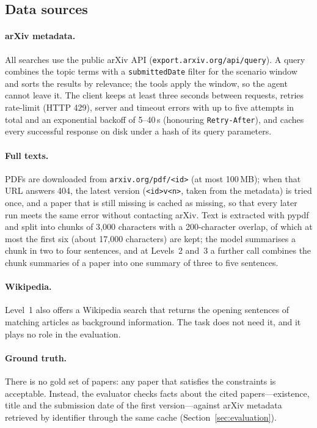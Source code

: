 \subsection{Data sources}
\label{sec:sources}

\paragraph{arXiv metadata.}
All searches use the public arXiv API (\texttt{export.arxiv.org/api/query}). A query combines the topic terms with a \texttt{submittedDate} filter for the scenario window and sorts the results by relevance; the tools apply the window, so the agent cannot leave it. The client keeps at least three seconds between requests, retries rate-limit (HTTP 429), server and timeout errors with up to five attempts in total and an exponential backoff of 5--40\,s (honouring \texttt{Retry-After}), and caches every successful response on disk under a hash of its query parameters.

\paragraph{Full texts.}
PDFs are downloaded from \texttt{arxiv.org/pdf/<id>} (at most 100\,MB); when that URL answers 404, the latest version (\texttt{<id>v<n>}, taken from the metadata) is tried once, and a paper that is still missing is cached as missing, so that every later run meets the same error without contacting arXiv. Text is extracted with pypdf and split into chunks of 3{,}000 characters with a 200-character overlap, of which at most the first six (about 17{,}000 characters) are kept; the model summarises a chunk in two to four sentences, and at Levels~2 and~3 a further call combines the chunk summaries of a paper into one summary of three to five sentences.

\paragraph{Wikipedia.}
Level~1 also offers a Wikipedia search that returns the opening sentences of matching articles as background information. The task does not need it, and it plays no role in the evaluation.

\paragraph{Ground truth.}
There is no gold set of papers: any paper that satisfies the constraints is acceptable. Instead, the evaluator checks facts about the cited papers---existence, title and the submission date of the first version---against arXiv metadata retrieved by identifier through the same cache (Section~\ref{sec:evaluation}).

